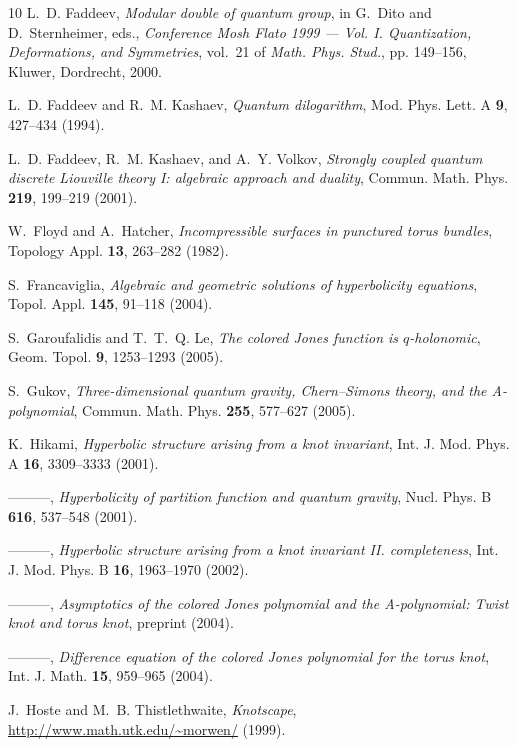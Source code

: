 \documentclass[12pt,reqno]{amsart}
\numberwithin{equation}{section}
\begin{document}
\begin{thebibliography}{10}
L.~D. Faddeev, \emph{Modular double of quantum group}, in G.~Dito and
  D.~Sternheimer, eds., \emph{Conference Mosh Flato 1999 --- Vol. I.
  Quantization, Deformations, and Symmetries}, vol.~21 of \emph{Math. Phys.
  Stud.}, pp. 149--156, Kluwer, Dordrecht, 2000.

L.~D. Faddeev and R.~M. Kashaev, \emph{Quantum dilogarithm}, Mod. Phys. Lett. A
  \textbf{9}, 427--434 (1994).

L.~D. Faddeev, R.~M. Kashaev, and A.~Y. Volkov, \emph{Strongly coupled quantum
  discrete {Liouville} theory {I}: algebraic approach and duality}, Commun.
  Math. Phys. \textbf{219}, 199--219 (2001).

W.~Floyd and A.~Hatcher, \emph{Incompressible surfaces in punctured torus
  bundles}, Topology Appl. \textbf{13}, 263--282 (1982).

S.~Francaviglia, \emph{Algebraic and geometric solutions of hyperbolicity
  equations}, Topol. Appl. \textbf{145}, 91--118 (2004).

S.~Garoufalidis and T.~T.~Q. Le, \emph{The colored {Jones} function is
  $q$-holonomic}, Geom. Topol. \textbf{9}, 1253--1293 (2005).

S.~Gukov, \emph{Three-dimensional quantum gravity, {Chern--Simons} theory, and
  the {A}-polynomial}, Commun. Math. Phys. \textbf{255}, 577--627 (2005).

K.~Hikami, \emph{Hyperbolic structure arising from a knot invariant}, Int. J.
  Mod. Phys. A \textbf{16}, 3309--3333 (2001).

---{}---{}---, \emph{Hyperbolicity of partition function and quantum gravity},
  Nucl. Phys. B \textbf{616}, 537--548 (2001).

---{}---{}---, \emph{Hyperbolic structure arising from a knot invariant {II}.
  completeness}, Int. J. Mod. Phys. B \textbf{16}, 1963--1970 (2002).

---{}---{}---, \emph{Asymptotics of the colored {Jones} polynomial and the
  {A}-polynomial: Twist knot and torus knot}, preprint  (2004).

---{}---{}---, \emph{Difference equation of the colored {Jones} polynomial for
  the torus knot}, Int. J. Math. \textbf{15}, 959--965 (2004).

J.~Hoste and M.~B. Thistlethwaite, \emph{Knotscape},
  \url{http://www.math.utk.edu/~morwen/}  (1999).


\end{thebibliography}
\end{document}
